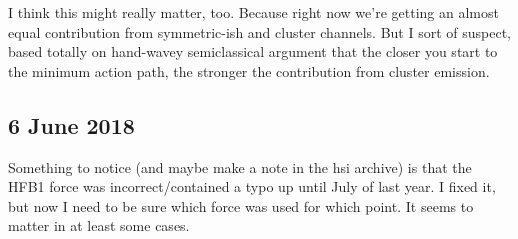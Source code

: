 I think this might really matter, too. Because right now we're getting an almost equal contribution from symmetric-ish and cluster channels. But I sort of suspect, based totally on hand-wavey semiclassical argument that the closer you start to the minimum action path, the stronger the contribution from cluster emission.

\subsection*{6 June 2018}
Something to notice (and maybe make a note in the hsi archive) is that the HFB1 force was incorrect/contained a typo up until July of last year. I fixed it, but now I need to be sure which force was used for which point. It seems to matter in at least some cases.